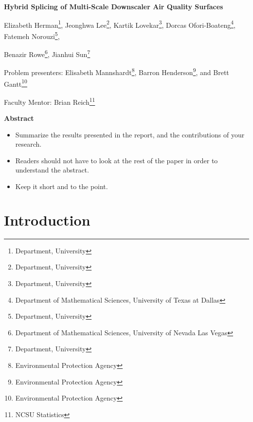 \documentclass[10pt]{article}
\begin{document}
\centerline{\large \bf Hybrid Splicing of Multi-Scale Downscaler Air Quality Surfaces}

\vspace{.1truein}

\def\thefootnote{\arabic{footnote}}
\begin{center}
  Elizabeth Herman\footnote{Department, University},
  Jeonghwa Lee\footnote{Department, University},
  Kartik Lovekar\footnote{Department, University},
  Dorcas Ofori-Boateng\footnote{Department of Mathematical Sciences, University of Texas at Dallas},
  Fatemeh Norouzi\footnote{Department, University},
  
  Benazir Rowe\footnote{Department of Mathematical Sciences, University of Nevada Las Vegas},
  Jianhui Sun\footnote{Department, University}
\end{center}


\begin{center}
Problem presenters: Elisabeth Mannshardt\footnote{Environmental Protection Agency}, Barron Henderson\footnote{Environmental Protection Agency}, and Brett Gantt\footnote{Environmental Protection Agency}

 
Faculty Mentor: Brian Reich\footnote{NCSU Statistics}
\end{center}


\vspace{.3truein}
\centerline{\bf Abstract}

\begin{itemize}
\item Summarize the results presented in the report, and the contributions
of your research.

\item Readers should not have to look at the rest of the paper in order to 
understand the abstract.

\item Keep it short and to the point.
\end{itemize}

\section{Introduction}

\end{document}
